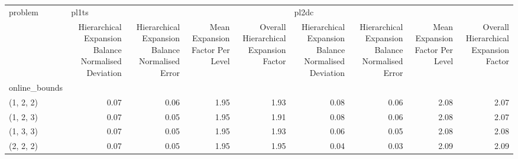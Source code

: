 \begin{tabular}{lrrrrrrrr}
\toprule
problem & \multicolumn{4}{l}{pl1ts} & \multicolumn{4}{l}{pl2dc} \\
{} & Hierarchical Expansion Balance Normalised Deviation & Hierarchical Expansion Balance Normalised Error & Mean Expansion Factor Per Level & Overall Hierarchical Expansion Factor & Hierarchical Expansion Balance Normalised Deviation & Hierarchical Expansion Balance Normalised Error & Mean Expansion Factor Per Level & Overall Hierarchical Expansion Factor \\
online\_bounds &                                                     &                                                 &                                 &                                       &                                                     &                                                 &                                 &                                       \\
\midrule
(1, 2, 2)     &                                               0.07 &                                            0.06 &                            1.95 &                                  1.93 &                                               0.08 &                                            0.06 &                            2.08 &                                  2.07 \\
(1, 2, 3)     &                                               0.07 &                                            0.05 &                            1.95 &                                  1.91 &                                               0.08 &                                            0.06 &                            2.08 &                                  2.07 \\
(1, 3, 3)     &                                               0.07 &                                            0.05 &                            1.95 &                                  1.93 &                                               0.06 &                                            0.05 &                            2.08 &                                  2.08 \\
(2, 2, 2)     &                                               0.07 &                                            0.05 &                            1.95 &                                  1.95 &                                               0.04 &                                            0.03 &                            2.09 &                                  2.09 \\

\end{tabular}
